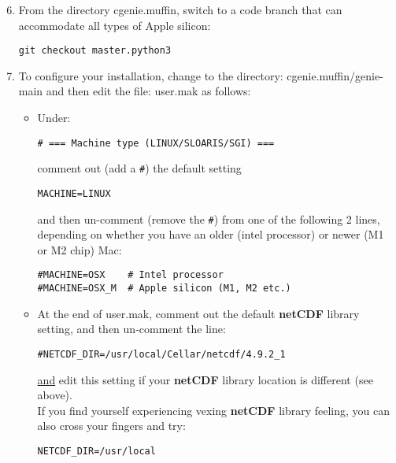 \documentclass[10pt,twoside]{article}
\begin{document}
\begin{enumerate}[noitemsep]
\setcounter{enumi}{5}

\vspace{1mm}
\item From the directory \textsf{cgenie.muffin}, switch to a code branch that can accommodate all types of Apple silicon:
\vspace{-2pt}
\begin{verbatim}
git checkout master.python3
\end{verbatim}
\vspace{-2pt}

\vspace{1mm}
\item To configure your installation, change to the directory: \textsf{cgenie.muffin/genie-main} and then edit the file: \textsf{user.mak} as follows:

\begin{itemize}

\vspace{1mm}
\item Under: 
\vspace{-2pt}
\begin{verbatim}
# === Machine type (LINUX/SLOARIS/SGI) ===
\end{verbatim}
\vspace{-2pt}
comment out (add a \texttt{\#}) the default setting
\vspace{-2pt}
\begin{verbatim}
MACHINE=LINUX
\end{verbatim}
and then un-comment (remove the \texttt{\#}) from one of the following 2 lines, depending on whether you have an older (intel processor) or newer (M1 or M2 chip) Mac:
\vspace{-2pt}
\begin{verbatim}
#MACHINE=OSX	# Intel processor
#MACHINE=OSX_M	# Apple silicon (M1, M2 etc.)
\end{verbatim}
\vspace{-2pt}

\vspace{1mm}
\item At the end of \textsf{user.mak}, comment out the default \textbf{netCDF} library setting, and then un-comment the line: 
\vspace{-2pt}
\begin{verbatim}
#NETCDF_DIR=/usr/local/Cellar/netcdf/4.9.2_1
\end{verbatim}
\vspace{-2pt}
\uline{and} edit this setting if your \textbf{netCDF} library location is different (see above). 
\\If you find yourself experiencing vexing \textbf{netCDF} library feeling, you can also cross your fingers and try:
\vspace{-2pt}
\begin{verbatim}
NETCDF_DIR=/usr/local
\end{verbatim}
\vspace{-2pt}


\end{itemize}
\end{enumerate}
\end{document}

